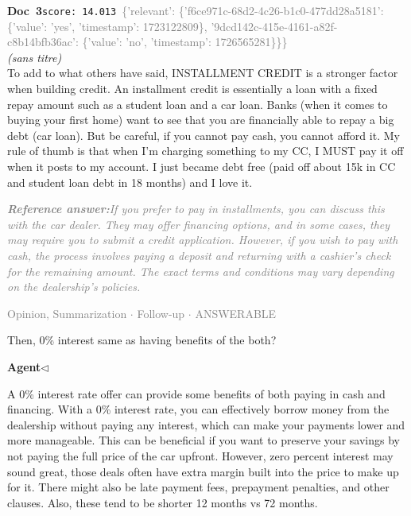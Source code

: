 \documentclass[a4paper,11pt]{article}
\begin{document}
\begin{docenv}
{\footnotesize\textcolor{doccolor}{\textbf{Doc~3}}}\hfill{\tiny\texttt{score:~14.013}}\ {\tiny\textcolor{gray}{\{'relevant': \{'f6ce971c-68d2-4c26-b1c0-477dd28a5181': \{'value': 'yes', 'timestamp': 1723122809\}, '9dcd142c-415e-4161-a82f-c8b14bfb36ac': \{'value': 'no', 'timestamp': 1726565281\}\}\}}}\\[3pt]
{\small\textit{(sans titre)}}\\[2pt]
\vspace{2pt}
{\footnotesize 
To add to what others have said, INSTALLMENT CREDIT is a stronger factor when building credit. An installment credit is essentially a loan with a fixed repay amount such as a student loan and a car loan. Banks (when it comes to buying your first home) want to see that you are financially able to repay a big debt (car loan). But be careful, if you cannot pay cash, you cannot afford it. My rule of thumb is that when I'm charging something to my CC, I MUST pay it off when it posts to my account. I just became debt free (paid off about 15k in CC and student loan debt in 18 months) and I love it.}
\end{docenv}
\begin{refanswerenv}
{\footnotesize\textit{\textcolor{gray}{\textbf{Reference answer:}\enspace If you prefer to pay in installments, you can discuss this with the car dealer. They may offer financing options, and in some cases, they may require you to submit a credit application. However, if you wish to pay with cash, the process involves paying a deposit and returning with a cashier's check for the remaining amount. The exact terms and conditions may vary depending on the dealership's policies.}}}
\end{refanswerenv}
\vspace{0.5em}
\hfill{\tiny\textcolor{gray}{Opinion, Summarization $\cdot$ Follow-up $\cdot$ ANSWERABLE}}
\begin{userbubble}
Then, 0\% interest same as having benefits of the both?
\end{userbubble}
\noindent\hfill{\small\textcolor{agentcolor}{\textbf{Agent\enspace$\triangleleft$}}}
\begin{agentbubble}
A 0\% interest rate offer can provide some benefits of both paying in cash and financing. With a 0\% interest rate, you can effectively borrow money from the dealership without paying any interest, which can make your payments lower and more manageable.  This can be beneficial if you want to preserve your savings by not paying the full price of the car upfront.  However, zero percent interest may sound great,  those deals often have extra margin built into the price to make up for it. There might also be late payment fees, prepayment penalties, and other clauses.  Also, these tend to be shorter 12 months vs  72 months. 
\end{agentbubble}
\end{document}
